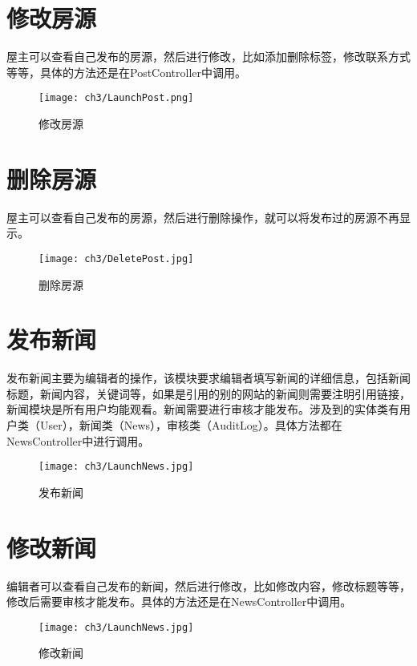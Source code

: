 \section{修改房源}
屋主可以查看自己发布的房源，然后进行修改，比如添加删除标签，修改联系方式等等，具体的方法还是在PostController中调用。
\begin{figure}[htbp]
    \centering
    \texttt{[image: ch3/LaunchPost.png]}
    \caption{修改房源}\label{fig:UpdatePost}
    \vspace{\baselineskip} %
\end{figure}
\section{删除房源}
屋主可以查看自己发布的房源，然后进行删除操作，就可以将发布过的房源不再显示。
\begin{figure}[htbp]
    \centering
    \texttt{[image: ch3/DeletePost.jpg]}
    \caption{删除房源}\label{fig:DeletePost}
    \vspace{\baselineskip} %
\end{figure}
\section{发布新闻}
发布新闻主要为编辑者的操作，该模块要求编辑者填写新闻的详细信息，包括新闻标题，新闻内容，关键词等，如果是引用的别的网站的新闻则需要注明引用链接，
新闻模块是所有用户均能观看。新闻需要进行审核才能发布。涉及到的实体类有用户类（User），新闻类（News），审核类（AuditLog）。具体方法都在NewsController中进行调用。
\begin{figure}[htbp]
    \centering
    \texttt{[image: ch3/LaunchNews.jpg]}
    \caption{发布新闻}\label{fig:LaunchNews}
    \vspace{\baselineskip} %
\end{figure}
\section{修改新闻}
编辑者可以查看自己发布的新闻，然后进行修改，比如修改内容，修改标题等等，修改后需要审核才能发布。具体的方法还是在NewsController中调用。
\begin{figure}[htbp]
    \centering
    \texttt{[image: ch3/LaunchNews.jpg]}
    \caption{修改新闻}\label{fig:UpdateNews}
    \vspace{\baselineskip} %
\end{figure}
